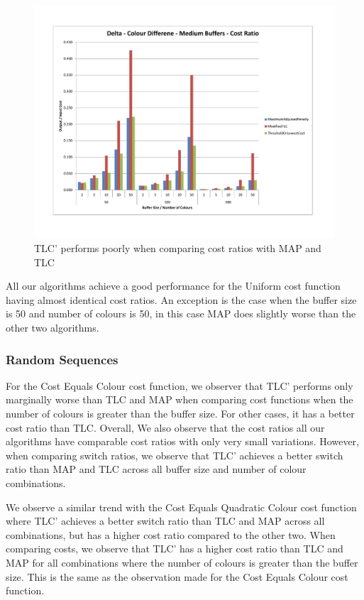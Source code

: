 \begin{figure}[ht]
\centering 
\includegraphics[scale=0.60]{Delta-cd-medium-cost.pdf}
\caption{TLC' performs poorly when comparing cost ratios with MAP and TLC}
\label{deltaCDMediumCost}
\end{figure}   

All our algorithms achieve a good performance for the Uniform cost function having almost identical cost ratios. An exception is the case when the buffer size is 50 and number of colours is 50, in this case MAP does slightly worse than the other two algorithms.

\subsubsection{Random Sequences}

For the Cost Equals Colour cost function, we observer that TLC' performs only marginally worse than TLC and MAP when comparing cost functions when the number of colours is greater than the buffer size. For other cases, it has a better cost ratio than TLC. Overall, We also observe that the cost ratios all our algorithms have comparable cost ratios with only very small variations. However, when comparing switch ratios, we observe that TLC' achieves a better switch ratio than MAP and TLC across all buffer size and number of colour combinations. 

We observe a similar trend with the Cost Equals Quadratic Colour cost function where TLC' achieves a better switch ratio than TLC and MAP across all combinations, but has a higher cost ratio compared to the other two. When comparing costs, we observe that TLC' has a higher cost ratio than TLC and MAP for all combinations where the number of colours is greater than the buffer size. This is the same as the observation made for the Cost Equals Colour cost function. 

